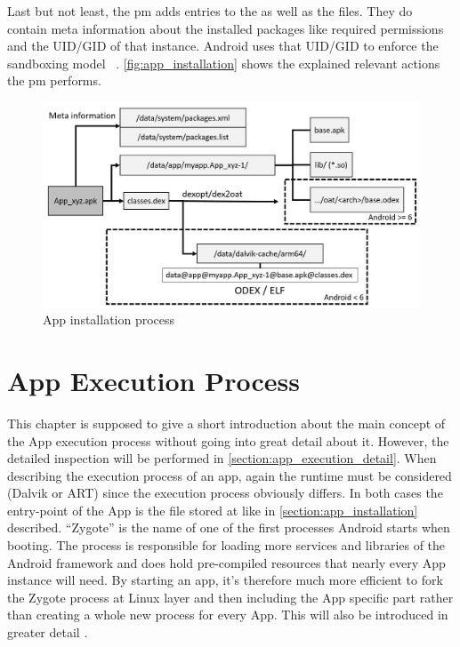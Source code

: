 Last but not least, the pm adds entries to the
 as well as the
 files. They do contain
meta information about the installed packages like
required permissions and the UID/GID of that instance.
Android uses that UID/GID to enforce the sandboxing model
~\parencite[ch.1]{securityinternals}.
\autoref{fig:app_installation} shows the explained
relevant actions the pm performs.

\begin{figure}[htb]
  \includegraphics[width=\textwidth]{figures/app_installation}
  \caption[App installation process]{App installation process}
  \label{fig:app_installation}
\end{figure}

\section{App Execution Process}\label{section:app_execution_simple}
This chapter is supposed to give a short introduction about the
main concept of the App execution process without going into
great detail about it. However, the detailed inspection will
be performed in \autoref{section:app_execution_detail}.
When describing the execution process of an app, again the
runtime must be considered (Dalvik or ART) since the execution process
obviously differs. In both cases the entry-point of the App is the
file stored at  like in
\autoref{section:app_installation} described. ``Zygote'' is
the name of one of the first processes Android starts when booting.
The process is responsible for loading more services and libraries
of the Android framework and does hold pre-compiled resources that
nearly every App instance will need.
By starting an app, it's therefore much more efficient to fork
the Zygote process at Linux layer and then including the App specific part
rather than  creating a whole new process for every App.
This will also be introduced in greater detail \parencite[ch.2]{hackershandbook}.


